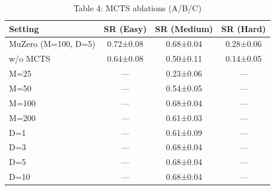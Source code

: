 \begin{table}[htbp]
\centering
\caption{Table 4: MCTS ablations (A/B/C)}
\begin{tabular}{lccc}
\toprule
Setting & SR (Easy) & SR (Medium) & SR (Hard) \\
\midrule
MuZero (M=100, D=5) & 0.72±0.08 & 0.68±0.04 & 0.28±0.06 \\
w/o MCTS & 0.64±0.08 & 0.50±0.11 & 0.14±0.05 \\
M=25 & — & 0.23±0.06 & — \\
M=50 & — & 0.54±0.05 & — \\
M=100 & — & 0.68±0.04 & — \\
M=200 & — & 0.61±0.03 & — \\
D=1 & — & 0.61±0.09 & — \\
D=3 & — & 0.68±0.04 & — \\
D=5 & — & 0.68±0.04 & — \\
D=10 & — & 0.68±0.04 & — \\
\bottomrule
\end{tabular}
\end{table}
